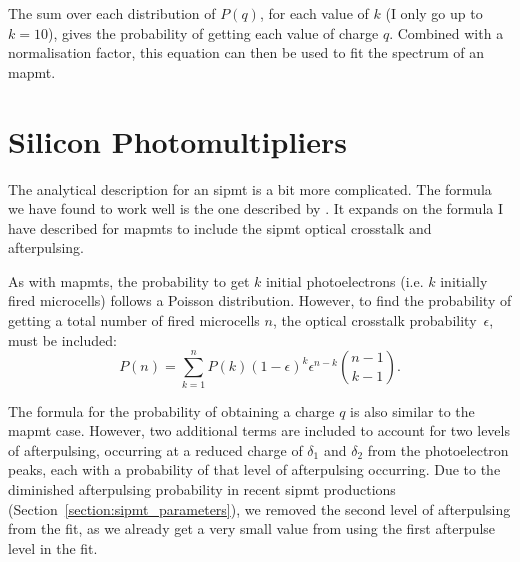 The sum over each distribution of $P(q)$, for each value of $k$ (I only go up to $k=10$), gives the probability of getting each value of charge $q$. Combined with a normalisation factor, this equation can then be used to fit the spectrum of an \gls{mapmt}.

\section{Silicon Photomultipliers}

The analytical description for an \gls{sipmt} is a bit more complicated. The formula we have found to work well is the one described by \textcite{Gentile2010}. It expands on the formula I have described for \glspl{mapmt} to include the \gls{sipmt} optical crosstalk and afterpulsing.

As with \glspl{mapmt}, the probability to get $k$ initial photoelectrons (i.e. $k$ initially fired microcells) follows a Poisson distribution. However, to find the probability of getting a total number of fired microcells $n$, the optical crosstalk probability~$\epsilon$, must be included:
\begin{equation}
P(n) = \sum_{k=1}^n P(k) (1 - \epsilon)^k \epsilon^{n-k} \binom{n-1}{k-1}.
\end{equation}

The formula for the probability of obtaining a charge $q$ is also similar to the \gls{mapmt} case. However, two additional terms are included to account for two levels of afterpulsing, occurring at a reduced charge of $\delta_1$ and $\delta_2$ from the photoelectron peaks, each with a probability of that level of afterpulsing occurring. Due to the diminished afterpulsing probability in recent \gls{sipmt} productions (Section~\ref{section:sipmt_parameters}), we removed the second level of afterpulsing from the fit, as we already get a very small value from using the first afterpulse level in the fit.